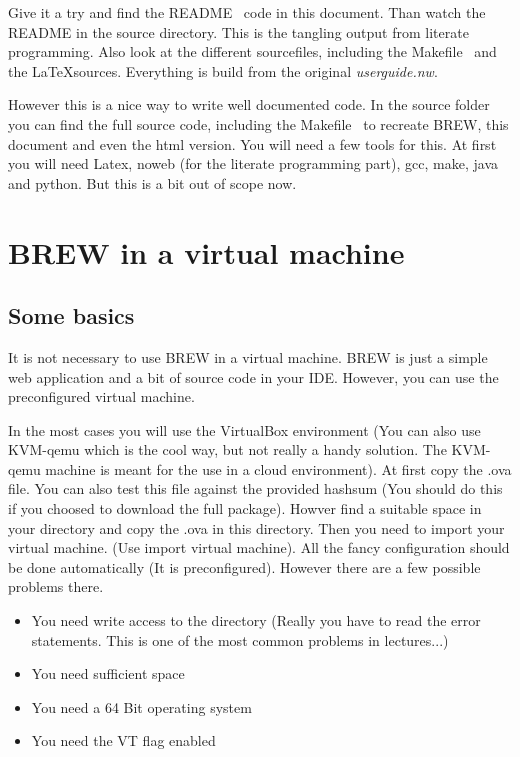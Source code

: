 \documentclass{llncs}%
\begin{document}
Give it a try and find the {\Tt{}\LA{}README~{\nwtagstyle{}}\RA{}\nwendquote} code in this document. Than watch the README in the source directory. This is the tangling output from literate programming. Also look at the different sourcefiles, including the {\Tt{}\LA{}Makefile~{\nwtagstyle{}}\RA{}\nwendquote} and the \LaTeX sources. Everything is build from the original {\em userguide.nw}.

However this is a nice way to write well documented code. In the source folder you can find the full source code, including the {\Tt{}\LA{}Makefile~{\nwtagstyle{}}\RA{}\nwendquote} to recreate BREW, this document and even the html version. You will need a few tools for this. At first you will need Latex, noweb (for the literate programming part), gcc, make, java and python. But this is a bit out of scope now.

\section{BREW in a virtual machine}
\subsection{Some basics}
It is not necessary to use BREW in a virtual machine. BREW is just a simple web application and a bit of source code in your IDE.
However, you can use the preconfigured virtual machine. 

In the most cases you will use the VirtualBox environment (You can also use KVM-qemu which is the cool way, but not really a handy solution. The KVM-qemu machine is meant for the use in a cloud environment). At first copy the .ova file. You can also test this file against the provided hashsum (You should do this if you choosed to download the full package). Howver find a suitable space in your directory and copy the .ova in this directory. Then you need to import your virtual machine. (Use import virtual machine). All the fancy configuration should be done automatically (It is preconfigured). However there are a few possible problems there. 

\begin{itemize}
\item You need write access to the directory (Really you have to read the error statements. This is one of the most common problems in lectures...)
\item You need sufficient space
\item You need a 64 Bit operating system
\item You need the VT flag enabled
\end{itemize} 
\end{document}
